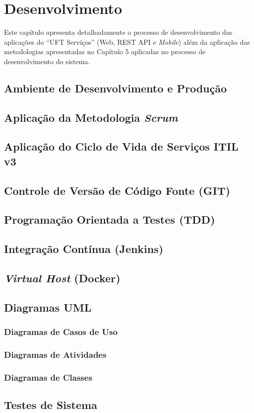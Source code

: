 \chapter{Desenvolvimento}

\noindent Este capítulo apresenta detalhadamente o processo de desenvolvimento das aplicações do ``UFT Serviços'' (Web, REST API e \textit{Mobile}) além da aplicação das metodologias apresentadas no Capítulo 5 aplicadas no processo de desenvolvimento do sistema.

\section{Ambiente de Desenvolvimento e Produção}

\section{Aplicação da Metodologia \textit{Scrum}}

\section{Aplicação do Ciclo de Vida de Serviços ITIL v3}

\section{Controle de Versão de Código Fonte (GIT)}

\section{Programação Orientada a Testes (TDD)}

\section{Integração Contínua (Jenkins)}

\section{\textit{Virtual Host} (Docker)}

\section{Diagramas UML}

\subsection{Diagramas de Casos de Uso}

\subsection{Diagramas de Atividades}

\subsection{Diagramas de Classes}

\section{Testes de Sistema}